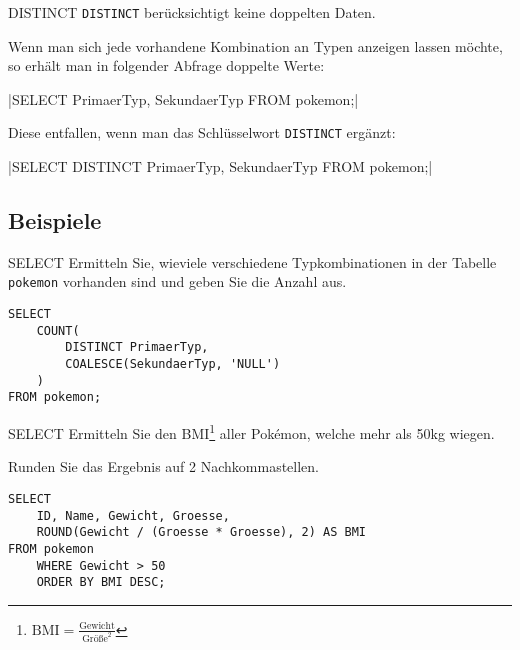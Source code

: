 \begin{sql}{DISTINCT}
    \texttt{DISTINCT} berücksichtigt keine doppelten Daten.

    Wenn man sich jede vorhandene Kombination an Typen anzeigen lassen möchte, so erhält man in folgender Abfrage doppelte Werte:

    |SELECT PrimaerTyp, SekundaerTyp FROM pokemon;|

    

    Diese entfallen, wenn man das Schlüsselwort \texttt{DISTINCT} ergänzt:

    |SELECT DISTINCT PrimaerTyp, SekundaerTyp FROM pokemon;|

    
\end{sql}

\subsection{Beispiele}

\begin{example}{SELECT}
    Ermitteln Sie, wieviele verschiedene Typkombinationen in der Tabelle \texttt{pokemon} vorhanden sind und geben Sie die Anzahl aus.

    \exampleseparator

    \begin{verbatim}
SELECT
    COUNT(
        DISTINCT PrimaerTyp,
        COALESCE(SekundaerTyp, 'NULL')
    )
FROM pokemon;
    \end{verbatim}

    
\end{example}

\begin{example}{SELECT}
    Ermitteln Sie den BMI\footnote{$\text{BMI} = \frac{\text{Gewicht}}{\text{Größe}^2}$} aller Pokémon, welche mehr als 50kg wiegen.
    
    Runden Sie das Ergebnis auf 2 Nachkommastellen.

    \exampleseparator

    \begin{verbatim}
SELECT
    ID, Name, Gewicht, Groesse,
    ROUND(Gewicht / (Groesse * Groesse), 2) AS BMI
FROM pokemon
    WHERE Gewicht > 50
    ORDER BY BMI DESC;
    \end{verbatim}

    
\end{example}

